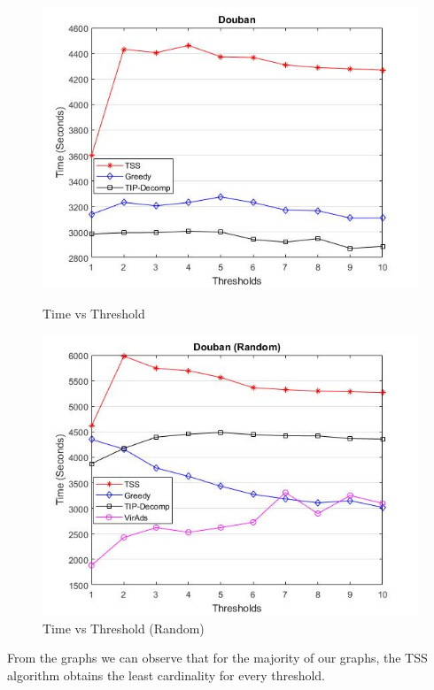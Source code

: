 \begin{figure}[h!]
\begin{minipage}[t]{0.50\textwidth}
\includegraphics[width=\linewidth,keepaspectratio=true]{images/doubantime.jpg}
\caption{Time vs Threshold}

\end{minipage}
\begin{minipage}[t]{0.50\textwidth}
\includegraphics[width=\linewidth,keepaspectratio=true]{images/doubantimerandom.jpg}
\caption{Time vs Threshold (Random)}
\end{minipage}
\end{figure}

From the graphs we can observe that for the majority of our graphs, the TSS algorithm obtains the least cardinality for every threshold.

